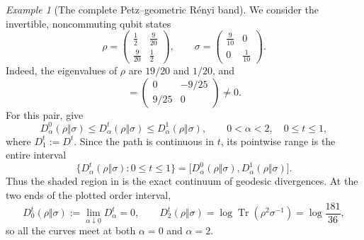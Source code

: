 \documentclass[11pt]{article}
\theoremstyle{remark}
\newtheorem{example}[example]{Example}
\newcommand{\1}{\mathbbm{1}}
\begin{document}
\begin{example}[The complete Petz--geometric R\'enyi band]
\label{rw:ex:renyi-interpolation-band}
We consider the invertible, noncommuting qubit states
\begin{equation}
 \rho=
 \begin{pmatrix}
  \frac12&\frac9{20}\\[1mm]
  \frac9{20}&\frac12
 \end{pmatrix},
 \qquad
 \sigma=
 \begin{pmatrix}
  \frac9{10}&0\\[1mm]
  0&\frac1{10}
 \end{pmatrix}.
 \label{rw:eq:renyi-band-states}
\end{equation}
Indeed, the eigenvalues of $\rho$ are $19/20$ and $1/20$, and
\begin{equation}
 [\rho,\sigma]
 =\begin{pmatrix}0&-9/25\\ 9/25&0\end{pmatrix}\neq0.
\end{equation}
For this pair,
give
\begin{equation}
 D_\alpha^0(\rho\Vert\sigma)
 \leq D_\alpha^t(\rho\Vert\sigma)
 \leq D_\alpha^1(\rho\Vert\sigma),
 \qquad 0<\alpha<2,\quad 0\leq t\leq1,
 \label{rw:eq:renyi-band-order}
\end{equation}
where $D_1^t:=D^t$.  Since the path is continuous in $t$, its
pointwise range is the entire interval
\begin{equation}
 \bigl\{D_\alpha^t(\rho\Vert\sigma):0\leq t\leq1\bigr\}
 =\bigl[D_\alpha^0(\rho\Vert\sigma),
        D_\alpha^1(\rho\Vert\sigma)\bigr].
 \label{rw:eq:renyi-band-range}
\end{equation}
Thus the shaded region in 
is the exact continuum of geodesic divergences.  At the two ends of the plotted order
interval,
\begin{equation}
 D_0^t(\rho\Vert\sigma):=\lim_{\alpha\downarrow0}D_\alpha^t
 =0,
 \qquad
 D_2^t(\rho\Vert\sigma)
 =\log\operatorname{Tr}(\rho^2\sigma^{-1})
 =\log\frac{181}{36},
 \label{rw:eq:renyi-band-meeting-points}
\end{equation}
so all the curves meet at both $\alpha=0$ and $\alpha=2$.
\end{example}
\end{document}
